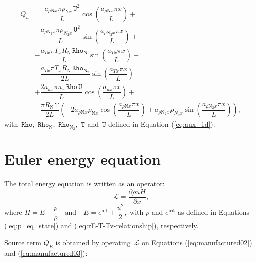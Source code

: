 \documentclass[10pt]{article}
\newcommand{\diff}[2] {\dfrac{\partial #1 }{\partial #2}}
\newcommand{\Lo}{\,\mathcal{L}}
\newcommand{\Rho}{\,\mathtt{Rho}}
\newcommand{\T}{\,\mathtt{T}}
\newcommand{\U}{\,\mathtt{U}}
\begin{document}
\begin{equation}
\begin{split}
Q_u &= \dfrac{a_{ \rho \text{N} x} \pi \rho_{\text{N}x} \U^2 }{L}\cos\left(\dfrac{a_{ \rho \text{N} x} \pi x}{L}\right)+\\
&-\dfrac{a_{ \rho \text{N}_2 x} \pi \rho_{N_2 x} \U^2 }{L}\sin\left(\dfrac{a_{ \rho \text{N}_2 x} \pi x}{L}\right)+\\
&-\dfrac{a_{Tx} \pi T_x R_\text{N} \Rho_\text{N} }{L}\sin\left(\dfrac{a_{Tx} \pi x}{L}\right)+\\
&-\dfrac{a_{Tx} \pi T_x R_\text{N} \Rho_{\text{N}_2} }{2L}\sin\left(\dfrac{a_{Tx} \pi x}{L}\right)+\\
&+\dfrac{2 a_{ux} \pi u_x \Rho \U }{L}\cos\left(\dfrac{a_{ux} \pi x}{L}\right)+\\
&-\dfrac{\pi R_\text{N} \T}{2L} \left(-2 a_{ \rho \text{N} x} \rho_{\text{N}x} \cos\left(\dfrac{a_{ \rho \text{N} x} \pi x}{L}\right)+a_{ \rho \text{N}_2 x} \rho_{N_2 x} \sin\left(\dfrac{a_{ \rho \text{N}_2 x} \pi x}{L}\right)\right),
\end{split}
\end{equation}
with $\Rho,\,\Rho_{\text{N}},\,\Rho_{\text{N}_2},\, \T$ and $\U$ defined in Equation (\ref{eq:aux_1d}).

\section{Euler energy equation}
The total energy equation is written as an operator:
\begin{equation*}
 \label{eq:euler1d_14}
\Lo =\diff{\rho u H}{x} ,
\end{equation*}
where $H= E+ \dfrac{p}{\rho} \quad \mbox{and}\quad E=e^{\text{int}} + \dfrac{u^2 }{2} ,$ with $p$ and $e^{\text{int}}$ as defined in Equations (\ref{eq:p_eq_state}) and (\ref{eq:rE-T-Tv-relationship}), respectively.

Source term $Q_E$ is obtained by operating $\Lo$ on Equations (\ref{eq:manufactured02}) and (\ref{eq:manufactured03}):
\end{document}
